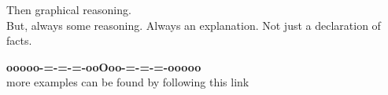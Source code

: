 \documentclass{ximera}
\begin{document}
Then graphical reasoning.  \\


But, always some reasoning.  Always an explanation. Not just a declaration of facts.








\begin{center}
\textbf{\textcolor{green!50!black}{ooooo-=-=-=-ooOoo-=-=-=-ooooo}} \\

more examples can be found by following this link\\ 

\end{center}
\end{document}
